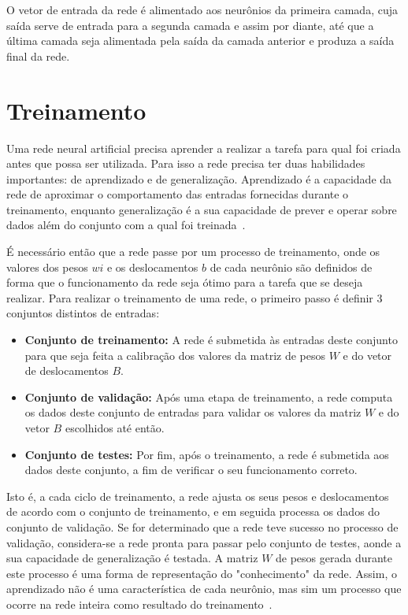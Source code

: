 O vetor de entrada da rede é alimentado aos neurônios da primeira camada, cuja saída serve de entrada para a segunda camada e assim por diante, até que a última camada seja alimentada pela saída da camada anterior e produza a saída final da rede. 

\section{Treinamento}
 Uma rede neural artificial precisa aprender a realizar a tarefa para qual foi criada antes que possa ser utilizada. Para isso a rede precisa ter duas habilidades importantes: de aprendizado e de generalização. Aprendizado é a capacidade da rede de aproximar o comportamento das entradas fornecidas durante o treinamento, enquanto generalização é a sua capacidade de prever e operar sobre dados além do conjunto com a qual foi treinada~\cite{ZhangNNSurvey}.

É necessário então que a rede passe por um processo de treinamento, onde os valores dos pesos $wi$ e os deslocamentos $b$ de cada neurônio são definidos de forma que o funcionamento da rede seja ótimo para a tarefa que se deseja realizar. Para realizar o treinamento de uma rede, o primeiro passo é definir 3 conjuntos distintos de entradas:

\begin{itemize}
	\item \textbf{Conjunto de treinamento:} A rede é submetida às entradas deste conjunto para que seja feita a calibração dos valores da matriz de pesos $W$ e do vetor de deslocamentos $B$.
	
	\item \textbf{Conjunto de validação:} Após uma etapa de treinamento, a rede computa os dados deste conjunto de entradas para validar os valores da matriz $W$ e do vetor $B$ escolhidos até então.
	
	\item \textbf{Conjunto de testes:} Por fim, após o treinamento, a rede é submetida aos dados deste conjunto, a fim de verificar o seu funcionamento correto.
\end{itemize}

Isto é, a cada ciclo de treinamento, a rede ajusta os seus pesos e deslocamentos de acordo com o conjunto de treinamento, e em seguida processa os dados do conjunto de validação. Se for determinado que a rede teve sucesso no processo de validação, considera-se a rede pronta para passar pelo conjunto de testes, aonde a sua capacidade de generalização é testada. A matriz $W$ de pesos gerada durante este processo é uma forma de representação do "conhecimento" da rede. Assim, o aprendizado não é uma característica de cada neurônio, mas sim um processo que ocorre na rede inteira como resultado do treinamento~\cite{Kosabov}.

